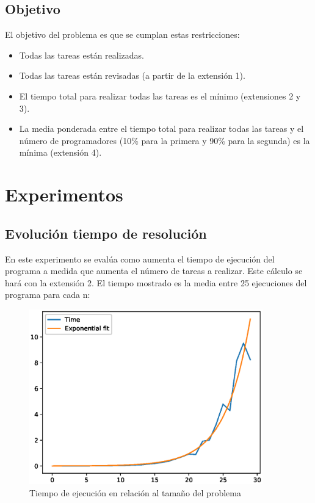 \documentclass[12pt, titlepage]{article}
\begin{document}
\subsection{Objetivo}

El objetivo del problema es que se cumplan estas restricciones:

\begin{itemize}
    \item Todas las tareas están realizadas.
    \item Todas las tareas están revisadas (a partir de la
        extensión 1).
    \item El tiempo total para realizar todas las tareas es el mínimo (extensiones 2 y 3).
    \item La media ponderada entre el tiempo total para realizar todas las tareas y el número de programadores (10\% para la primera y 90\% para la segunda) es la mínima (extensión 4).
\end{itemize}



\appendix

\section{Experimentos}

\subsection{Evolución tiempo de resolución}

En este experimento se evalúa como aumenta el tiempo de ejecución del programa a
medida que aumenta el número de tareas a realizar. Este cálculo se hará con la
extensión 2. El tiempo mostrado es la media entre 25 ejecuciones del programa para cada n:
\begin{figure}[!h]
    \centering
    \includegraphics[width=0.9\textwidth]{time_graph}
    \caption{Tiempo de ejecución en relación al tamaño del problema}
    \label{fig:time_graph}
\end{figure}
\end{document}
